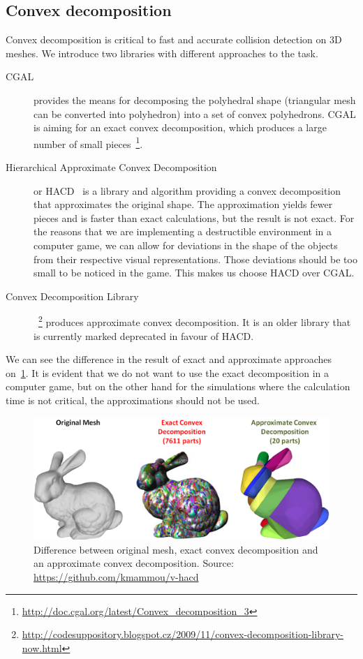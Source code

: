 \subsection{Convex decomposition}
\label{sec:decompositionLib}
Convex decomposition is critical to fast and accurate collision detection on 3D meshes. We introduce two libraries with different approaches to the task.
\begin{description}
\item[CGAL] provides the means for decomposing the polyhedral shape (triangular mesh can be converted into polyhedron) into a set of convex polyhedrons. CGAL is aiming for an exact convex decomposition, which produces a large number of small pieces~\footnote{\url{http://doc.cgal.org/latest/Convex\_decomposition\_3}}.

\item[Hierarchical Approximate Convex Decomposition] or HACD~\cite{HACD} is a library and algorithm providing a convex decomposition that approximates the original shape. The approximation yields fewer pieces and is faster than exact calculations, but the result is not exact. For the reasons that we are implementing a destructible environment in a computer game, we can allow for deviations in the shape of the objects from their respective visual representations. Those deviations should be too small to be noticed in the game. This makes us choose HACD over CGAL.

\item[Convex Decomposition Library]~\footnote{\url{http://codesuppository.blogspot.cz/2009/11/convex-decomposition-library-now.html}} produces approximate convex decomposition. It is an older library that is currently marked deprecated in favour of HACD. 
\end{description}

We can see the difference in the result of exact and approximate approaches on~\cref{fig:bunny}. It is evident that we do not want to use the exact decomposition in a computer game, but on the other hand for the simulations where the calculation time is not critical, the approximations should not be used.
\begin{figure}
        \centering
        \includegraphics[width=\textwidth]{img/bunny}
        \caption{Difference between original mesh, exact convex decomposition and an approximate convex decomposition. Source: \url{https://github.com/kmammou/v-hacd}}
        \label{fig:bunny}
\end{figure}



